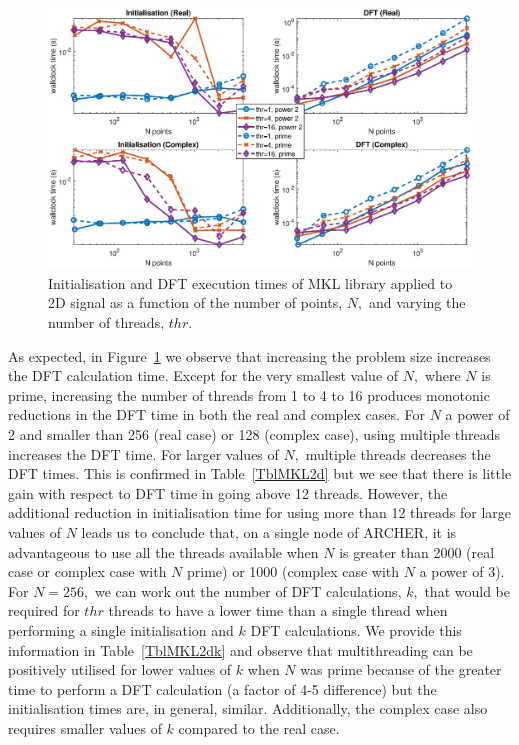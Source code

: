 \documentclass[a4paper]{article}
\begin{document}
\begin{figure}[htb]
    \centering
    \includegraphics[width=0.9\linewidth]{../results/mkl_2d_thr.eps}
  \caption{Initialisation and DFT execution times of MKL library applied to 2D signal as a function of the
    number of points, $N,$ and varying the number of threads, $thr.$ }
  \label{2DMKL}
\end{figure}




As expected, in Figure~\ref{2DMKL} we observe that increasing the
problem size increases the DFT calculation time. Except for the very
smallest value of $N,$ where $N$ is prime, increasing the number of
threads from 1 to 4 to 16 produces monotonic reductions in the DFT
time in both the real and complex cases. For $N$ a power of 2 and
smaller than 256 (real case) or 128 (complex case), using multiple
threads increases the DFT time. For larger values of $N,$ multiple
threads decreases the DFT times. This is confirmed in
Table~\ref{TblMKL2d} but we see that there is little gain with
respect to DFT time in going above 12 threads. However, the additional
reduction in initialisation time for using more than 12 threads for
large values of $N$ leads us to conclude that, on a single node of
ARCHER, it is advantageous to use all the threads available when $N$
is greater than 2000 (real case or complex case with $N$ prime) or
1000 (complex case with $N$ a power of 3). For $N=256,$ we can work
out the number of DFT calculations, $k,$ that would be required for
$thr$ threads to have a lower time than a single thread when
performing a single initialisation and $k$ DFT calculations. We
provide this information in Table~\ref{TblMKL2dk} and observe that
multithreading can be positively utilised for lower values of $k$ when
$N$ was prime because of the greater time to perform a DFT calculation
(a factor of 4-5 difference) but the initialisation times are, in
general, similar. Additionally, the complex case also requires smaller
values of $k$ compared to the real case.
\end{document}

